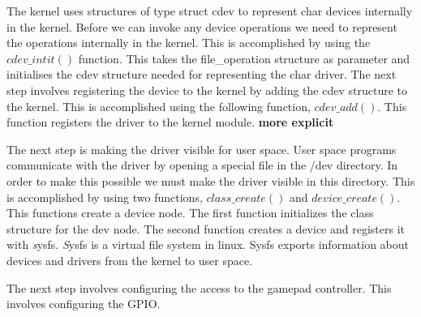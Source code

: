 The kernel uses structures of type struct cdev to represent char devices internally in the kernel. Before we can invoke any device operations we need to represent the operations internally in the kernel. This is accomplished by using the $cdev\_intit()$ function. This takes the file\_operation structure as parameter and initialises the cdev structure needed for representing the char driver. The next step involves registering the device to the kernel by adding the cdev structure to the kernel. This is accomplished using the following function, $cdev\_add()$. This function registers the driver to the kernel module. {\bf more explicit} 

The next step is making the driver visible for user space. User space programs communicate with the driver by opening a special file in the /dev directory. In order to make this possible we must make the driver visible in this directory. This is accomplished by using two functions, $class\_create()$ and $device\_create()$. This functions create a device node. The first function initializes the class structure for the dev node. The second function creates a device and registers it with \emph sysfs. \emph Sysfs is a virtual file system in linux. Sysfs exports information about devices and drivers from the kernel to user space. 


The next step involves configuring the access to the gamepad controller. This involves configuring the GPIO. 

















  













